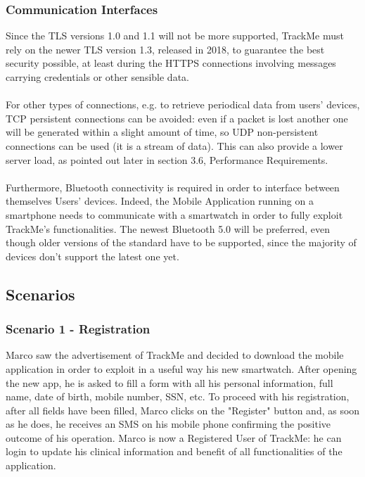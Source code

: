 \documentclass[12pt,a4paper]{article}
\begin{document}
	\subsubsection{Communication Interfaces}
			Since the TLS versions 1.0 and 1.1 will not be more supported, TrackMe must rely on the newer TLS version 1.3, released in 2018, to guarantee the best security possible, at least during the HTTPS connections involving messages carrying credentials or other sensible data.
			\\ \\
			For other types of connections, e.g. to retrieve periodical data from users' devices, TCP persistent connections can be avoided: even if a packet is lost another one will be generated within a slight amount of time, so UDP non-persistent connections can be used (it is a stream of data). This can also provide a lower server load, as pointed out later in section 3.6, Performance Requirements.
			\\ \\
			Furthermore, Bluetooth connectivity is required in order to interface between themselves Users' devices. Indeed, the Mobile Application running on a smartphone needs to communicate with a smartwatch in order to fully exploit TrackMe's functionalities. The newest Bluetooth 5.0 will be preferred, even though older versions of the standard have to be supported, since the majority of devices don't support the latest one yet.

	\newpage
	\subsection{Scenarios}
	\subsubsection*{Scenario 1 - Registration}
		Marco saw the advertisement of TrackMe and decided to download the mobile application in order to exploit in a useful way his new smartwatch. After opening the new app, he is asked to fill a form with all his personal information, full name, date of birth, mobile number, SSN, etc. To proceed with his registration, after all fields have been filled, Marco clicks on the "Register" button and, as soon as he does, he receives an SMS on his mobile phone confirming the positive outcome of his operation. Marco is now a Registered User of TrackMe: he can login to update his clinical information and benefit of all functionalities of the application.
\end{document}
